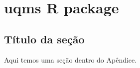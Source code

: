 \chapter{uqms R package}\label{apendiceA}


\section{Título da seção}

Aqui temos uma seção dentro do Apêndice.

